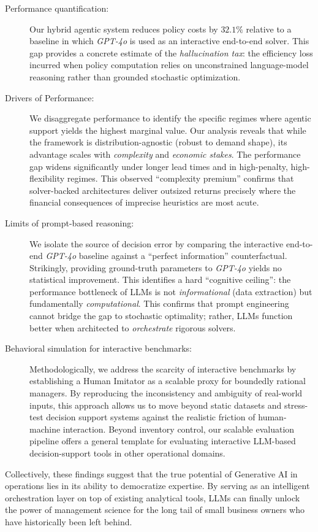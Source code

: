     \begin{description}
        \item[Performance quantification:] Our hybrid agentic system reduces policy costs by $32.1\%$ relative to a baseline in which \emph{GPT-4o} is used as an interactive end-to-end solver. This gap provides a concrete estimate of the \emph{hallucination tax}: the efficiency loss incurred when policy computation relies on unconstrained language-model reasoning rather than grounded stochastic optimization. 

   
        
        \item[Drivers of Performance:] We disaggregate performance to identify the specific regimes where agentic support yields the highest marginal value. Our analysis reveals that while the framework is distribution-agnostic (robust to demand shape), its advantage scales with \textit{complexity} and \textit{economic stakes}. The performance gap widens significantly under longer lead times and in high-penalty, high-flexibility regimes. This observed ``complexity premium'' confirms that solver-backed architectures deliver outsized returns precisely where the financial consequences of imprecise heuristics are most acute.

    \item[Limits of prompt-based reasoning:] We isolate the source of decision error by comparing the interactive end-to-end \emph{GPT-4o} baseline against a ``perfect information'' counterfactual. Strikingly, providing ground-truth parameters to \emph{GPT-4o} yields no statistical improvement. This identifies a hard ``cognitive ceiling'': the performance bottleneck of LLMs is not \textit{informational} (data extraction) but fundamentally \textit{computational}. This confirms that prompt engineering cannot bridge the gap to stochastic optimality; rather, LLMs function better when architected to \emph{orchestrate} rigorous solvers.
        
      
        

        \item[Behavioral simulation for interactive benchmarks:] Methodologically, we address the scarcity of interactive benchmarks by establishing a Human Imitator as a scalable proxy for boundedly rational managers. By reproducing the inconsistency and ambiguity of real-world inputs, this approach allows us to move beyond static datasets and stress-test decision support systems against the realistic friction of human-machine interaction. Beyond inventory control, our scalable evaluation pipeline offers a general template for evaluating interactive LLM-based decision-support tools in other operational domains.

    \end{description}
    
    Collectively, these findings suggest that the true potential of Generative AI in operations lies in its ability to democratize expertise. By serving as an intelligent orchestration layer on top of existing analytical tools, LLMs can finally unlock the power of management science for the long tail of small business owners who have historically been left behind.